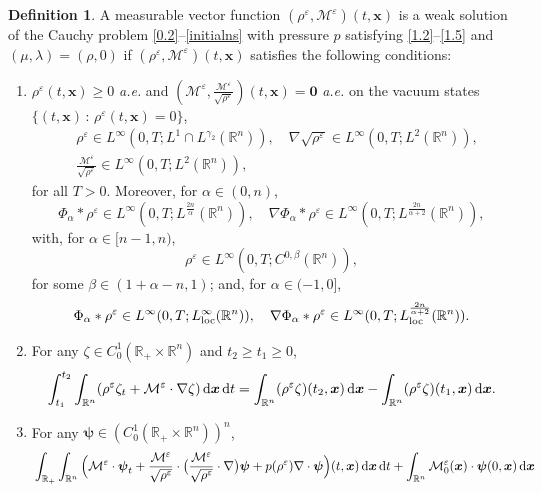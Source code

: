 \documentclass[reqno,11pt]{amsart}
\numberwithin{equation}{section}
\theoremstyle{definition}
\newtheorem{definition}[theorem]{Definition}
\def\v{\varepsilon}
\def\dd{{\, \rm d}}
\def\M{{\mathcal{M}}}
\begin{document}
\begin{definition}\label{CNSREs}
A measurable vector function $(\rho^\varepsilon,\M^\varepsilon)(t,\boldsymbol{x})$
is a weak solution
of the Cauchy problem \eqref{0.2}--\eqref{initialns} 
with pressure $p$ satisfying \eqref{1.2}--\eqref{1.5} and $(\mu,\lambda) = (\rho,0)$
if $(\rho^\varepsilon,\M^\varepsilon)(t,\boldsymbol{x})$ satisfies
the following conditions{\rm :}
\begin{enumerate}
\item[(a)] $\rho^\varepsilon(t,\boldsymbol{x}) \geq 0$ {\it a.e.} and
$(\M^\varepsilon, \frac{\M^\varepsilon}{\sqrt{\rho^\varepsilon}})(t,\boldsymbol{x})
= \boldsymbol{0}$ {\it a.e.} on the vacuum states
$\{ (t,\boldsymbol{x}) \, : \, \rho^\varepsilon(t,\boldsymbol{x}) = 0 \}$,
    \begin{align*}
&\rho^\v\in L^{\infty}(0,T; L^1\cap L^{\gamma_2}(\mathbb{R}^n)),
\quad   \nabla\sqrt{\rho^\v}\in  L^{\infty}(0,T; L^2(\mathbb{R}^n)),\\
&\frac{\M^\v}{\sqrt{\rho^\v}}\in L^{\infty}(0,T; L^2(\mathbb{R}^n)),
    \end{align*}
for all $T>0$. Moreover, for $\alpha \in (0,n)$,
    \[
 \Phi_\alpha * \rho^\v\in L^\infty(0,T;L^{\frac{2n}{\alpha}}(\mathbb{R}^n) ),\quad
\nabla\Phi_\alpha * \rho^\v\in L^\infty(0,T;L^{\frac{2n}{\alpha + 2}}(\mathbb{R}^n)),
    \]
with, for $\alpha \in [n-1,n)$,
    \[
  \rho^\v \in L^\infty(0,T;C^{0,\beta}(\mathbb{R}^n)),
    \]
    for some $\beta \in (1 + \alpha - n,1)$; and, for $\alpha \in (-1,0]$,
    \[
  \Phi_\alpha * \rho^\v\in L^\infty(0,T;L^\infty_{\rm loc}(\mathbb{R}^n) ),\quad
\nabla\Phi_\alpha * \rho^\v\in L^\infty(0,T;L_{\rm loc}^{\frac{2n}{\alpha + 2}}(\mathbb{R}^n)).
    \]
\item[(b)] For any $\zeta \in C^1_0(\mathbb{R}_+ \times \mathbb{R}^n)$ and $t_2 \geq t_1 \geq 0$,
    \begin{equation*}
\int_{t_1}^{t_2} \int_{\mathbb{R}^n} (\rho^\v \zeta_t + \M^\v \cdot \nabla \zeta) \dd \boldsymbol{x} \dd t = \int_{\mathbb{R}^n} (\rho^\v \zeta)(t_2,\boldsymbol{x}) \dd \boldsymbol{x} - \int_{\mathbb{R}^n} (\rho^\v \zeta)(t_1,\boldsymbol{x}) \dd \boldsymbol{x}.
    \end{equation*}
\item[(c)] For any $\boldsymbol{\psi} \in (C^1_0(\mathbb{R}_+\times \mathbb{R}^n))^n$,
    \begin{align*}
 \begin{split}
 & \int_{\mathbb{R}_+} \int_{\mathbb{R}^n}
\Big( \M^\v \cdot \boldsymbol{\psi}_t
 + \frac{\M^\v}{\sqrt{\rho^\v}} \cdot \big( \frac{\M^\v}{\sqrt{\rho^\v}} \cdot \nabla\big) \boldsymbol{\psi} + p(\rho^\v)\nabla \cdot \boldsymbol{\psi} \Big)(t,\boldsymbol{x}) \dd \boldsymbol{x} \dd t + \int_{\mathbb{R}^n} \M^\v_0(\boldsymbol{x}) \cdot \boldsymbol{\psi}(0,\boldsymbol{x}) \dd \boldsymbol{x} \\

\end{split}
\end{align*}
\end{enumerate}
\end{definition}
\end{document}
